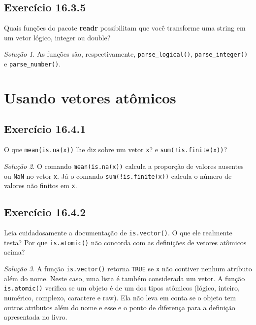 \documentclass[
]{latex/krantz}
\theoremstyle{definition}
\theoremstyle{definition}
\theoremstyle{definition}
\theoremstyle{definition}
\theoremstyle{remark}
\newtheorem*{solution}{Solução}
\begin{document}
\hypertarget{exr16-3-5}{%
\subsection*{Exercício 16.3.5}\label{exr16-3-5}}

Quais funções do pacote \textbf{readr} possibilitam que você transforme uma string em um vetor lógico, integer ou double?

\begin{solution}
As funções são, respectivamente, \texttt{parse\_logical()}, \texttt{parse\_integer()} e \texttt{parse\_number()}.
\end{solution}

\hypertarget{usando-vetores-atuxf4micos}{%
\section{Usando vetores atômicos}\label{usando-vetores-atuxf4micos}}

\hypertarget{exr16-4-1}{%
\subsection*{Exercício 16.4.1}\label{exr16-4-1}}

O que \texttt{mean(is.na(x))} lhe diz sobre um vetor \texttt{x}? e \texttt{sum(!is.finite(x))}?

\begin{solution}
O comando \texttt{mean(is.na(x))} calcula a proporção de valores ausentes ou \texttt{NaN} no vetor \texttt{x}. Já o comando \texttt{sum(!is.finite(x))} calcula o número de valores não finitos em \texttt{x}.
\end{solution}

\hypertarget{exr16-4-2}{%
\subsection*{Exercício 16.4.2}\label{exr16-4-2}}

Leia cuidadosamente a documentação de \texttt{is.vector()}. O que ele realmente testa? Por que \texttt{is.atomic()} não concorda com as definições de vetores atômicos acima?

\begin{solution}
A função \texttt{is.vector()} retorna \texttt{TRUE} se \texttt{x} não contiver nenhum atributo além do nome. Neste caso, uma lista é também considerada um vetor.
A função \texttt{is.atomic()} verifica se um objeto é de um dos tipos atômicos (lógico, inteiro, numérico, complexo, caractere e raw). Ela não leva em conta se o objeto tem outros atributos além do nome e esse e o ponto de diferença para a definição apresentada no livro.
\end{solution}
\end{document}
